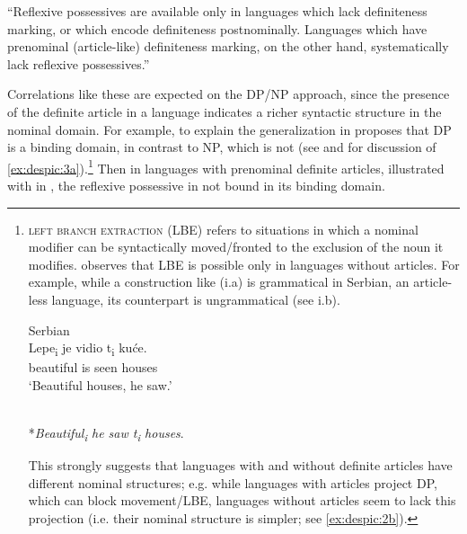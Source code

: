 \documentclass[output=paper,
modfonts
]{langscibook}
\begin{document}
	\ex \label{ex:despic:3b}
	``Reflexive possessives are available only in languages which lack definiteness marking, or which encode definiteness postnominally. Languages which have prenominal (article-like) definiteness marking, on the other hand, systematically lack reflexive possessives.'' \citep{Reuland2011, Despic2015}
	\z
	\z 
	
	Correlations like these are expected on the DP/NP approach, since the presence of the definite article in a language indicates a richer syntactic structure in the nominal domain. 
	For example, to explain the generalization in  \citet{Despic2015} proposes that DP is a binding domain, in contrast to NP, which is not (see \citealt{Boskovic2012} and \citealt{Despic2015} for discussion of \ref{ex:despic:3a}).\footnote{\textsc{left branch extraction} (LBE) refers to situations in which a nominal modifier can be syntactically moved/fronted to the exclusion of the noun it modifies. \citet{Boskovic2008, Boskovic2012} observes that LBE is possible only in languages without articles. For example, while a construction like (i.a) is grammatical in Serbian, an article-less language, its  counterpart is ungrammatical (see i.b). 

		\begin{exe}
		 \label{ex:despic:n3}
		\ea \label{ex:despic:n3a}
		\textnormal{Serbian} \\
		\gll Lepe\textnormal{\textsubscript{i}} je vidio {\ob}\textnormal{t\textsubscript{i}} ku\'ce{\cb}. \\ beautiful is seen {} houses \\ 
		\glt `Beautiful houses, he saw.' 
		
		\ex \label{ex:despic:n3b}
		\textnormal{} \\ \largerpage
		\textnormal{*}\textit{Beautiful\textnormal{\textsubscript{i}} he saw {\ob}\textnormal{t\textsubscript{i}} houses{\cb}}. 
		\z 
		\end{exe}
	
	This strongly suggests that languages with and without definite articles have different nominal structures; e.g. while languages with articles project DP, which can block movement/LBE, languages without articles seem to lack this projection (i.e. their nominal structure is simpler; see \ref{ex:despic:2b}).
	}
	Then in languages with prenominal definite articles, illustrated with  in , the reflexive possessive in not bound in its binding domain.
	
\end{document}
